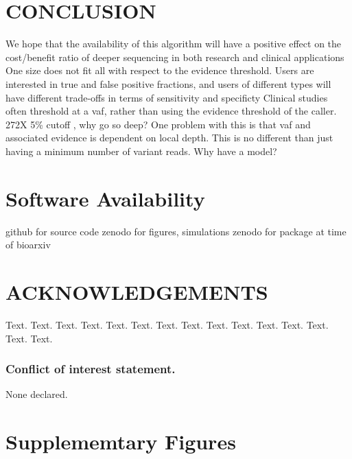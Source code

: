 \documentclass[a4,center,fleqn]{NAR}
\newcommand{\beginsupplement}{%
        \clearpage
        \onecolumn
        \setcounter{table}{0}
        \renewcommand{\thetable}{S\arabic{table}}%
        \setcounter{figure}{0}
        \renewcommand{\thefigure}{S\arabic{figure}}%
     }
\begin{document}
\section{CONCLUSION}

We hope that the availability of this algorithm will have a positive effect on the cost/benefit ratio of deeper sequencing in both research and clinical applications
One size does not fit all with respect to the evidence threshold. Users are interested in true and false positive fractions, and users of different types will have different trade-offs in terms of sensitivity and specificty
Clinical studies often threshold at a vaf, rather than using the evidence threshold of the caller. 272X 5\% cutoff \cite{Parsons2016}, why go so deep?
One problem with this is that vaf and associated evidence is dependent on local depth. This is no different than just having a minimum number of variant reads. Why have a model?

\section{Software Availability}
github for source code
zenodo for figures, simulations
zenodo for package at time of bioarxiv

\section{ACKNOWLEDGEMENTS}

Text. Text. Text. Text. Text. Text. Text. Text. Text. Text. Text.
Text. Text. Text. Text.


\subsubsection{Conflict of interest statement.} None declared.



\beginsupplement
\section{Supplememtary Figures}
\end{document}
